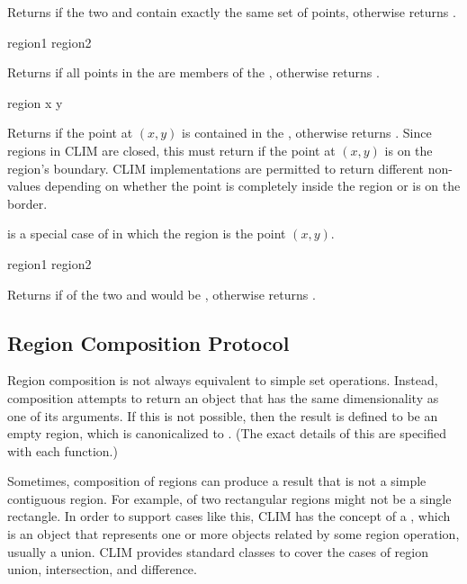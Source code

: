 Returns  if the two   and 
contain exactly the same set of points, otherwise returns .

 {region1 region2}

Returns  if all points in the   are members
of the  , otherwise returns .

 {region x y}

Returns  if the point at $(x,y)$ is contained in the 
, otherwise returns .  Since regions in CLIM are closed,
this must return  if the point at $(x,y)$ is on the region's
boundary.  CLIM implementations are permitted to return different non-
values depending on whether the point is completely inside the region or is on
the border.

 is a special case of 
in which the region is the point $(x,y)$.

 {region1 region2}

Returns  if  of the two 
 and  would be , otherwise returns
.


\subsection {Region Composition Protocol}

Region composition is not always equivalent to simple set operations.  Instead,
composition attempts to return an object that has the same dimensionality as one
of its arguments.  If this is not possible, then the result is defined to be an
empty region, which is canonicalized to .  (The exact details of
this are specified with each function.)

Sometimes, composition of regions can produce a result that is not a simple
contiguous region.  For example,  of two rectangular regions
might not be a single rectangle.  In order to support cases like this, CLIM has
the concept of a , which is an object that represents one or
more  objects related by some region operation, usually a union.
CLIM provides standard classes to cover the cases of region union, intersection,
and difference.

